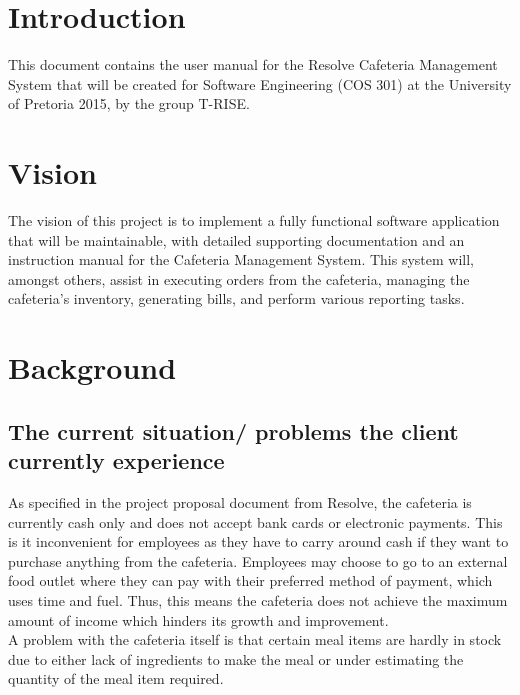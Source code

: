 \documentclass[a4paper,12pt]{report}
\begin{document}
\pagebreak
\pagebreak
\section{Introduction}
This document contains the user manual for the Resolve Cafeteria Management System that will be created for Software Engineering (COS 301) at the University of Pretoria 2015, by the group T-RISE. 

\section{Vision}
The vision of this project is to implement a fully functional software application that will be maintainable, with detailed supporting documentation and an instruction manual for the Cafeteria Management System. This system will, amongst others, assist in executing orders from the cafeteria, managing the cafeteria's inventory, generating bills, and perform various reporting tasks. 

\section{Background}
\subsection{The current situation/ problems the client currently experience}
As specified in the project proposal document from Resolve, the cafeteria is currently cash only and does not accept bank cards or electronic payments. This is it inconvenient for employees as they have to carry around cash if they want to purchase anything from the cafeteria. Employees may choose to go to an external food outlet where they can pay with their preferred method of payment, which uses time and fuel. Thus, this means the cafeteria does not achieve the maximum amount of income which hinders its growth and improvement.\\ A problem with the cafeteria itself is that certain meal items are hardly in stock due to either lack of ingredients to make the meal or under estimating the quantity of the meal item required.
\end{document}
